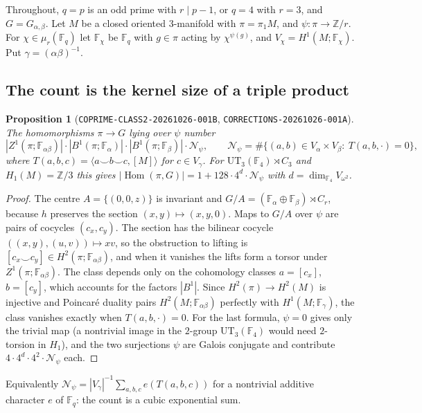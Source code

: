 \documentclass[11pt]{article}
\newtheorem{proposition}[theorem]{Proposition}
\theoremstyle{definition}
\theoremstyle{remark}
\newcommand{\F}{\mathbb{F}}
\newcommand{\Z}{\mathbb{Z}}
\newcommand{\Hom}{\operatorname{Hom}}
\newcommand{\cN}{\mathcal{N}}
\begin{document}
Throughout, $q=p$ is an odd prime with $r\mid p-1$, or $q=4$ with $r=3$, and
$G=G_{\alpha,\beta}$. Let $M$ be a closed oriented 3-manifold with
$\pi=\pi_1M$, and $\psi\colon\pi\to\Z/r$. For $\chi\in\mu_r(\F_q)$ let
$\F_\chi$ be $\F_q$ with $g\in\pi$ acting by $\chi^{\psi(g)}$, and
$V_\chi=H^1(M;\F_\chi)$. Put $\gamma=(\alpha\beta)^{-1}$.

\subsection{The count is the kernel size of a triple product}

\begin{proposition}[\texttt{COPRIME-CLASS2-20261026-001B}, \texttt{CORRECTIONS-20261026-001A}]\label{prop:count}
The homomorphisms $\pi\to G$ lying over $\psi$ number
\[
|Z^1(\pi;\F_{\alpha\beta})|\cdot|B^1(\pi;\F_\alpha)|\cdot|B^1(\pi;\F_\beta)|\cdot\cN_\psi,
\qquad \cN_\psi=\#\{(a,b)\in V_\alpha\times V_\beta:\ T(a,b,\cdot)=0\},
\]
where $T(a,b,c)=\langle a\smile b\smile c,[M]\rangle$ for $c\in V_\gamma$. For
$\mathrm{UT}_3(\F_4)\rtimes C_3$ and $H_1(M)=\Z/3$ this gives
$|\Hom(\pi,G)|=1+128\cdot4^d\cdot\cN_\psi$ with $d=\dim_{\F_4}V_{\omega^2}$.
\end{proposition}

\begin{proof}
The centre $A=\{(0,0,z)\}$ is invariant and $G/A=(\F_\alpha\oplus\F_\beta)
\rtimes C_r$, because $h$ preserves the section $(x,y)\mapsto(x,y,0)$. Maps to
$G/A$ over $\psi$ are pairs of cocycles $(c_x,c_y)$. The section has the
bilinear cocycle $((x,y),(u,v))\mapsto xv$, so the obstruction to lifting is
$[c_x\smile c_y]\in H^2(\pi;\F_{\alpha\beta})$, and when it vanishes the lifts
form a torsor under $Z^1(\pi;\F_{\alpha\beta})$. The class depends only on
the cohomology classes $a=[c_x]$, $b=[c_y]$, which accounts for the factors
$|B^1|$. Since $H^2(\pi)\to H^2(M)$ is injective and Poincar\'e duality pairs
$H^2(M;\F_{\alpha\beta})$ perfectly with $H^1(M;\F_\gamma)$, the class vanishes
exactly when $T(a,b,\cdot)=0$. For the last formula, $\psi=0$ gives only the
trivial map (a nontrivial image in the $2$-group $\mathrm{UT}_3(\F_4)$ would
need $2$-torsion in $H_1$), and the two surjections $\psi$ are Galois conjugate
and contribute $4\cdot4^d\cdot4^2\cdot\cN_\psi$ each.
\end{proof}

Equivalently $\cN_\psi=|V_\gamma|^{-1}\sum_{a,b,c}e(T(a,b,c))$ for a nontrivial
additive character $e$ of $\F_q$: the count is a cubic exponential sum.
\end{document}
